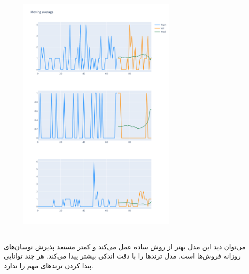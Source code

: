 \documentclass{article}
\begin{document}
\begin{figure}[hbt!]
	\centering
	\includegraphics[width=\textwidth,height=12cm]{Outputs/29.png}
\end{figure}
\ \\
‌می‌توان دید این مدل بهتر از روش ساده عمل می‌کند و کمتر مستعد پذیرش نوسان‌های روزانه فروش‌ها است. مدل  ترندها را با دقت اندکی بیشتر پیدا می‌کند. هر چند توانایی پیدا کردن ترندهای مهم را ندارد.
\end{document}
